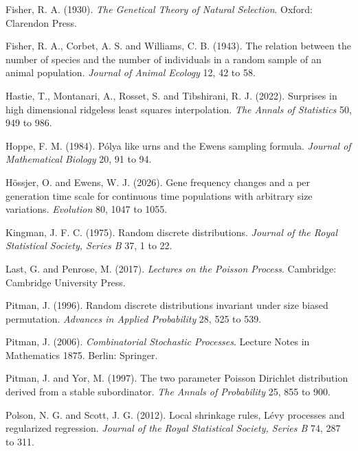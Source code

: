 \begin{thebibliography}{}
Fisher, R. A. (1930). \emph{The Genetical Theory of Natural Selection}. Oxford: Clarendon
Press.

Fisher, R. A., Corbet, A. S. and Williams, C. B. (1943). The relation between the
number of species and the number of individuals in a random sample of an animal
population. \emph{Journal of Animal Ecology} 12, 42 to 58.

Hastie, T., Montanari, A., Rosset, S. and Tibshirani, R. J. (2022). Surprises in
high dimensional ridgeless least squares interpolation. \emph{The Annals of Statistics} 50,
949 to 986.

Hoppe, F. M. (1984). P\'olya like urns and the Ewens sampling formula.
\emph{Journal of Mathematical Biology} 20, 91 to 94.

H\"ossjer, O. and Ewens, W. J. (2026). Gene frequency changes and a per generation time scale
for continuous time populations with arbitrary size variations. \emph{Evolution} 80, 1047 to 1055.

Kingman, J. F. C. (1975). Random discrete distributions. \emph{Journal of the Royal
Statistical Society, Series B} 37, 1 to 22.

Last, G. and Penrose, M. (2017). \emph{Lectures on the Poisson Process}. Cambridge:
Cambridge University Press.

Pitman, J. (1996). Random discrete distributions invariant under size biased permutation.
\emph{Advances in Applied Probability} 28, 525 to 539.

Pitman, J. (2006). \emph{Combinatorial Stochastic Processes}. Lecture Notes in
Mathematics 1875. Berlin: Springer.

Pitman, J. and Yor, M. (1997). The two parameter Poisson Dirichlet distribution
derived from a stable subordinator. \emph{The Annals of Probability} 25, 855 to 900.

Polson, N. G. and Scott, J. G. (2012). Local shrinkage rules, L\'evy processes and
regularized regression. \emph{Journal of the Royal Statistical Society, Series B} 74,
287 to 311.


\end{thebibliography}
